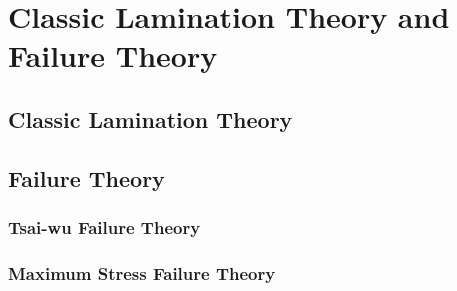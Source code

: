 
\chapter{Classic Lamination Theory and Failure Theory} %

\label{Chapter2} %


\section{Classic Lamination Theory}


\section{Failure Theory}
\subsection{Tsai-wu Failure Theory}
\subsection{Maximum Stress Failure Theory}

